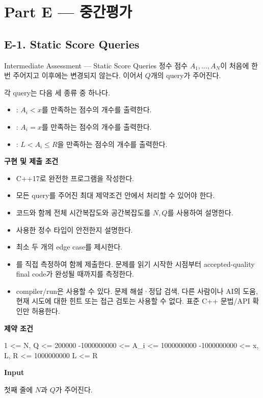 \section{Part E --- 중간평가}

\subsection{E-1. Static Score Queries}

\begin{problembox}{Intermediate Assessment --- Static Score Queries}
정수 점수 $A_1,\dots,A_N$이 처음에 한 번 주어지고 이후에는 변경되지 않는다. 이어서 $Q$개의 query가 주어진다.

각 query는 다음 세 종류 중 하나다.
\begin{itemize}
\item {}: $A_i<x$를 만족하는 점수의 개수를 출력한다.
\item {}: $A_i=x$를 만족하는 점수의 개수를 출력한다.
\item {}: $L<A_i\le R$을 만족하는 점수의 개수를 출력한다.
\end{itemize}

\textbf{구현 및 제출 조건}
\begin{itemize}
\item C++17로 완전한 프로그램을 작성한다.
\item 모든 query를 주어진 최대 제약조건 안에서 처리할 수 있어야 한다.
\item 코드와 함께 전체 시간복잡도와 공간복잡도를 $N,Q$를 사용하여 설명한다.
\item 사용한 정수 타입이 안전한지 설명한다.
\item 최소 두 개의 edge case를 제시한다.
\item {}를 직접 측정하여 함께 제출한다. 문제를 읽기 시작한 시점부터 accepted-quality final code가 완성될 때까지를 측정한다.
\item compiler/run은 사용할 수 있다. 문제 해설·정답 검색, 다른 사람이나 AI의 도움, 현재 시도에 대한 힌트 또는 접근 검토는 사용할 수 없다. 표준 C++ 문법/API 확인만 허용한다.
\end{itemize}

\textbf{제약 조건}
\begin{TextBlock}
1 <= N, Q <= 200000
-1000000000 <= A_i <= 1000000000
-1000000000 <= x, L, R <= 1000000000
L <= R
\end{TextBlock}

\textbf{Input}

첫째 줄에 $N$과 $Q$가 주어진다.


\end{problembox}

